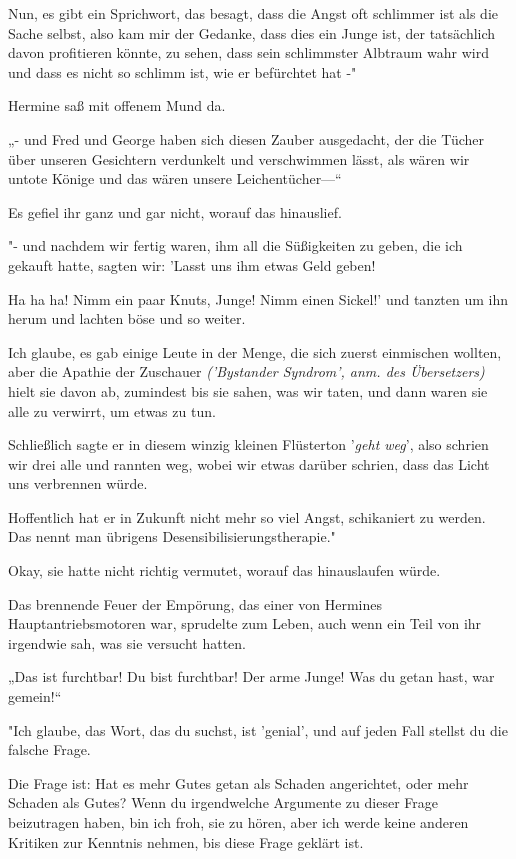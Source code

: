 {Nun, es gibt ein Sprichwort, das besagt, dass die Angst oft schlimmer ist als die Sache selbst, also kam mir der Gedanke, dass dies ein Junge ist, der tatsächlich davon profitieren könnte, zu sehen, dass sein schlimmster Albtraum wahr wird und dass es nicht so schlimm ist, wie er befürchtet hat -"

Hermine saß mit offenem Mund da.

„- und Fred und George haben sich diesen Zauber ausgedacht, der die Tücher über unseren Gesichtern verdunkelt und verschwimmen lässt, als wären wir untote Könige und das wären unsere Leichentücher—“

Es gefiel ihr ganz und gar nicht, worauf das hinauslief.

"- und nachdem wir fertig waren, ihm all die Süßigkeiten zu geben, die ich gekauft hatte, sagten wir: 'Lasst uns ihm etwas Geld geben!

Ha ha ha! Nimm ein paar Knuts, Junge! Nimm einen Sickel!' und tanzten um ihn herum und lachten böse und so weiter.

Ich glaube, es gab einige Leute in der Menge, die sich zuerst einmischen wollten, aber die Apathie der Zuschauer \emph{('Bystander Syndrom', anm. des Übersetzers)} hielt sie davon ab, zumindest bis sie sahen, was wir taten, und dann waren sie alle zu verwirrt, um etwas zu tun.

Schließlich sagte er in diesem winzig kleinen Flüsterton '\emph{geht weg}', also schrien wir drei alle und rannten weg, wobei wir etwas darüber schrien, dass das Licht uns verbrennen würde.

Hoffentlich hat er in Zukunft nicht mehr so viel Angst, schikaniert zu werden. Das nennt man übrigens Desensibilisierungstherapie."

Okay, sie hatte nicht richtig vermutet, worauf das hinauslaufen würde.

Das brennende Feuer der Empörung, das einer von Hermines Hauptantriebsmotoren war, sprudelte zum Leben, auch wenn ein Teil von ihr irgendwie sah, was sie versucht hatten.

„Das ist furchtbar! Du bist furchtbar! Der arme Junge! Was du getan hast, war gemein!“

"Ich glaube, das Wort, das du suchst, ist 'genial', und auf jeden Fall stellst du die falsche Frage.

Die Frage ist: Hat es mehr Gutes getan als Schaden angerichtet, oder mehr Schaden als Gutes? Wenn du irgendwelche Argumente zu dieser Frage beizutragen haben, bin ich froh, sie zu hören, aber ich werde keine anderen Kritiken zur Kenntnis nehmen, bis diese Frage geklärt ist.

}
